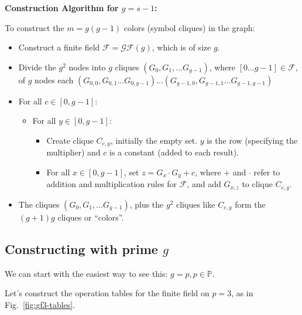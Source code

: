 \documentclass[11pt, oneside]{article} 	%
\begin{document}
\begin{framed}
\textbf{Construction Algorithm for $g=s-1$:}

To construct the $m = g(g-1)$ colors (symbol cliques) in the graph:
\begin{itemize}
 \item Construct a finite field $\mathcal{F} = \mathcal{GF}(g) $, which is of size $g$.
 \item Divide the $g^2$ nodes into $g$ cliques $(G_0, G_1, ... G_{g-1})$, where $[0...g-1] \in \mathcal{F}$, of $g$ nodes each $(G_{0,0}, G_{0,1}...G_{0,g-1}) ...(G_{g-1,0}, G_{g-1,1}...G_{g-1,g-1})$
 \item For all $c \in [0,g-1]$: 
 \begin{itemize}
 \item For all $y \in [0,g-1]$: 
 \begin{itemize}
 \item Create clique $C_{c,y}$, initially the empty set.  $y$ is the row (specifying the multiplier) and $c$ is a constant (added to each result).
 \item For all $x \in [0,g-1]$, set $z = G_x \cdot G_y + c$, where $+$ and $\cdot$ refer to addition and multiplication rules for $\mathcal{F}$, and add $G_{x, z}$ to clique $C_{c, y}$.
 \end{itemize}
 \end{itemize}
 \item The cliques $(G_0, G_1, ... G_{g-1})$, plus the $g^2$ cliques like $C_{c, y}$ form the $(g+1)g$ cliques or ``colors''.
\end{itemize}
\end{framed}


\subsection{Constructing with prime $g$}

We can start with the easiest way to see this: $g = p, p \in \mathbb{P}$.

Let's construct the operation tables for the finite field on $p=3$, as in Fig.~\ref{fig:gf3-tables}.
\end{document}
